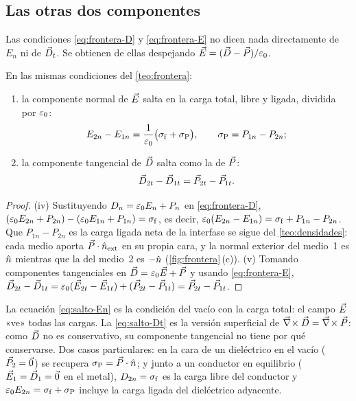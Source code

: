 \subsection{Las otras dos componentes}\label{sec:otras-componentes}

Las condiciones \eqref{eq:frontera-D} y \eqref{eq:frontera-E} no dicen nada directamente de $E_n$ ni de $\vD_t$. Se obtienen
de ellas despejando $\vec E=(\vec D-\vec P)/\varepsilon_0$.

\begin{corolario}[Saltos de $E_n$ y de $\vD_t$]\label{cor:otras}
En las mismas condiciones del \cref{teo:frontera}:
\begin{enumerate}[start=4]
  \item la componente normal de $\vec E$ salta en la carga total, libre y ligada, dividida por $\varepsilon_0$:
        \begin{equation}\label{eq:salto-En}
          E_{2n}-E_{1n}=\frac{1}{\varepsilon_0}\big(\sigma_{\mathrm f}+\sigma_{\mathrm P}\big),
          \qquad \sigma_{\mathrm P}=P_{1n}-P_{2n} ;
        \end{equation}
  \item la componente tangencial de $\vec D$ salta como la de $\vec P$:
        \begin{equation}\label{eq:salto-Dt}
          \vec D_{2t}-\vec D_{1t}=\vec P_{2t}-\vec P_{1t} .
        \end{equation}
\end{enumerate}
\end{corolario}

\begin{proof}
(iv) Sustituyendo $D_n=\varepsilon_0 E_n+P_n$ en \eqref{eq:frontera-D},
$(\varepsilon_0 E_{2n}+P_{2n})-(\varepsilon_0 E_{1n}+P_{1n})=\sigma_{\mathrm f}$, es decir, $\varepsilon_0(E_{2n}-E_{1n})=\sigma_{\mathrm f}+P_{1n}-P_{2n}$. Que $P_{1n}-P_{2n}$ es la carga ligada neta de la
interfase se sigue del \cref{teo:densidades}: cada medio aporta $\vec P\cdot\hat n_{\mathrm{ext}}$ en su propia cara, y la normal exterior del
medio~1 es $\hat n$ mientras que la del medio~2 es $-\hat n$ (\cref{fig:frontera}\,(c)).
(v) Tomando componentes tangenciales en $\vec D=\varepsilon_0\vec E+\vec P$ y usando \eqref{eq:frontera-E},
$\vec D_{2t}-\vec D_{1t}=\varepsilon_0(\vec E_{2t}-\vec E_{1t})+(\vec P_{2t}-\vec P_{1t})=\vec P_{2t}-\vec P_{1t}$.
\end{proof}

\begin{observacion}\label{obs:lectura-saltos}
La ecuación \eqref{eq:salto-En} es la condición del vacío con la carga total: el campo $\vec E$ «ve» todas las cargas. La
\eqref{eq:salto-Dt} es la versión superficial de $\vec\nabla\!\times\vec D=\vec\nabla\!\times\vec P$: como $\vec D$ no es conservativo, su componente tangencial no tiene
por qué conservarse. Dos casos particulares: en la cara de un dieléctrico en el vacío ($\vec P_2=\vec 0$) se recupera
$\sigma_{\mathrm P}=\vec P\cdot\hat n$; y junto a un conductor en equilibrio ($\vec E_1=\vec D_1=\vec 0$ en el metal), $D_{2n}=\sigma_{\mathrm f}$ es la carga libre del conductor y
$\varepsilon_0 E_{2n}=\sigma_{\mathrm f}+\sigma_{\mathrm P}$ incluye la carga ligada del dieléctrico adyacente.
\end{observacion}

